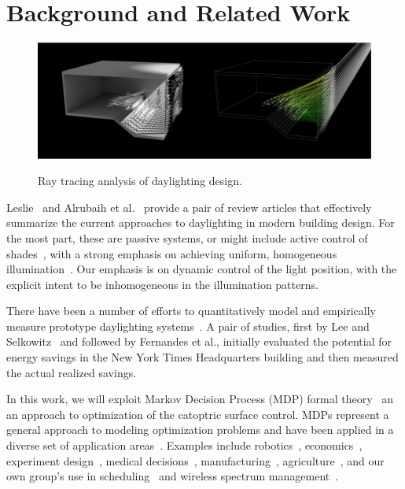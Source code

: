 \section{Background and Related Work}
\label{sec:background}


\begin{figure}[ht]
\centering
\includegraphics[width=0.8\linewidth]{figures/raytracing}
\label{fig:raytracing}
\caption{Ray tracing analysis of daylighting design.}
\end{figure}

Leslie~\cite{Leslie03} and Alrubaih et al.~\cite{azaise13} provide
a pair of review articles that effectively summarize the current
approaches to daylighting in modern building design.
For the most part, these are passive systems, or might include
active control of shades~\cite{kt16}, with a strong emphasis on
achieving uniform, homogeneous illumination~\cite{bwkk15,gb16}.
Our emphasis is on dynamic control of the light position, with the explicit
intent to be inhomogeneous in the illumination patterns.

There have been a number of efforts to quantitatively model and
empirically measure prototype daylighting
systems~\cite{bwkk15,fsdm14,ls06,vgf+13}. A pair of studies, first by
Lee and Selkowitz~\cite{ls06} and followed by Fernandes et al.\cite{fsdm14},
initially evaluated the potential for energy savings in the New York Times
Headquarters building and then measured the actual realized savings.

In this work, we will exploit Markov Decision Process (MDP)
formal theory~\cite{puterman} an an approach to optimization of the
catoptric surface control. MDPs represent a general approach
to modeling optimization problems and have been applied in a diverse set of
application areas~\cite{White93}. Examples include robotics~\cite{ab10}, 
economics~\cite{bs98}, experiment design~\cite{kb85},
medical decisions~\cite{ahsr10}, manufacturing~\cite{yyl04},
agriculture~\cite{Kristensen03},
and our own group's use in scheduling~\cite{gtsg08,tggs10}
and wireless spectrum management~\cite{mgc16}.

